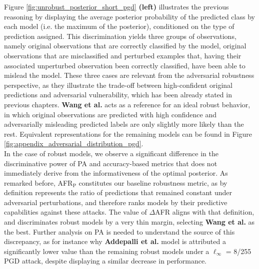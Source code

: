 Figure \ref{fig:unrobust_posterior_short_pgd} \textbf{(left)} illustrates
the previous reasoning by displaying the average posterior
probability of the predicted class by each model (i.e. the maximum of the posterior), 
conditioned on the type of prediction assigned. This discrimination yields three groups of observations,
namely original observations that are correctly classified by the model, 
original observations that are misclassified and perturbed examples that, having their 
associated unperturbed observation been correctly classified, 
have been able to mislead the model. These three cases are relevant from the 
adversarial robustness perspective,  as they illustrate the trade-off between high-confident 
original predictions and adversarial vulnerability, which has been already stated in 
previous chapters. {\color{tab:brown} \textbf{Wang et al.}}
acts as a reference for an ideal robust behavior, in which original observations are
predicted with high confidence and adversarially misleading predicted labels are 
only slightly more likely than the rest. Equivalent representations for the remaining
models can be found in Figure \ref{fig:appendix_adversarial_distribution_pgd}. \\

In the case of robust models, we observe a significant difference in the 
discriminative power of PA and accuracy-based metrics that does not immediately
derive from the informativeness of the optimal posterior. As remarked before, AFR$_\text{P}$
constitutes our baseline robustness metric, as by definition represents the ratio
of predictions that remained constant under adversarial perturbations, and
therefore ranks models by their predictive capabilities against these attacks. The
value of $\Delta$AFR aligns with that definition, and discriminates robust models
by a very thin margin, selecting {\color{tab:brown} \textbf{Wang et al.}} as
the best. Further analysis on PA is needed to understand the source of this 
discrepancy, as for instance why {\color{tab:purple} \textbf{Addepalli et al.}} model
is attributed a significantly lower value than the remaining robust models
under a $\ell_\infty$ = 8/255 PGD attack, despite displaying a similar decrease in performance. \\

